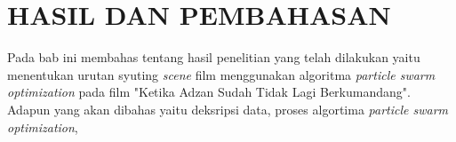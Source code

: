 \renewcommand{\thechapter}{\arabic{chapter}}
\chapter{HASIL DAN PEMBAHASAN}\label{babEmpat}
\renewcommand{\thechapter}{\arabic{chapter}}
\vspace{8mm}

{\frenchspacing
    Pada bab ini membahas tentang hasil penelitian yang telah dilakukan yaitu menentukan
    urutan syuting \textit{scene} film menggunakan algoritma \textit{particle swarm optimization}
    pada film "Ketika Adzan Sudah Tidak Lagi Berkumandang".
    Adapun yang akan dibahas yaitu deksripsi data, proses algortima \textit{particle swarm optimization},
}

\section{}

\pagebreak